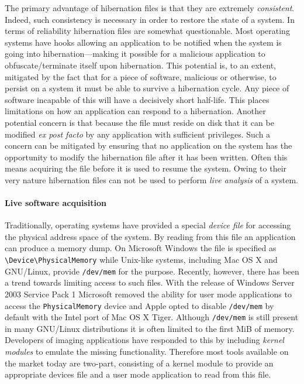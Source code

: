 \documentclass[numbers=noenddot,      %
               abstract,              %
               captions=tableheading, %
               DIV=8]                 %
              {scrartcl}
\begin{document}
The primary advantage of hibernation files is that they are extremely
\emph{consistent}. Indeed, such consistency is necessary in order to
restore the state of a system. In terms of reliability hibernation files
are somewhat questionable. Most operating systems have hooks allowing an
application to be notified when the system is going into
hibernation---making it possible for a malicious application to
obfuscate/terminate itself upon hibernation. This potential is, to an
extent, mitigated by the fact that for a piece of software, malicious or
otherwise, to persist on a system it must be able to survive a
hibernation cycle. Any piece of software incapable of this will have a
decisively short half-life. This places limitations on how an
application can respond to a hibernation. Another potential concern is
that because the file must reside on disk that it can be modified
\emph{ex post facto} by any application with sufficient
privileges. Such a concern can be mitigated by ensuring that no
application on the system has the opportunity to modify the hibernation
file after it has been written. Often this means acquiring the file
before it is used to resume the system. Owing to their very nature
hibernation files can not be used to perform \emph{live analysis} of a
system.

\paragraph{Live software acquisition}
Traditionally, operating systems have provided a special \emph{device
  file} for accessing the physical address space of the system. By
reading from this file an application can produce a memory dump. On
Microsoft Windows the file is specified as \verb:\Device\PhysicalMemory:
while Unix-like systems, including Mac OS X and GNU/Linux, provide
\verb:/dev/mem: for the purpose. Recently, however, there has been a
trend towards limiting access to such files. With the release of Windows
Server 2003 Service Pack 1 Microsoft removed the ability for user mode
applications to access the \verb:PhysicalMemory: device and Apple opted
to disable \verb:/dev/mem: by default with the Intel port of Mac OS X
Tiger. Although \verb:/dev/mem: is still present in many GNU/Linux
distributions it is often limited to the first \unit[1]{MiB} of
memory. Developers of imaging applications have responded to this by
including \emph{kernel modules} to emulate the missing
functionality. Therefore most tools available on the market today are
two-part, consisting of a kernel module to provide an appropriate
devices file and a user mode application to read from this file.
\end{document}
